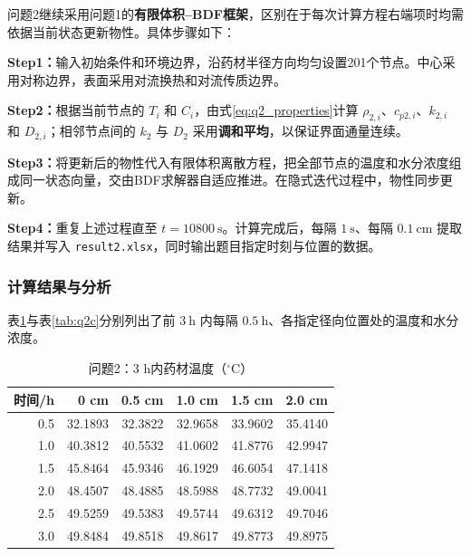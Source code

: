 \documentclass[12pt,a4paper,fontset=none]{ctexart}
\begin{document}
问题2继续采用问题1的\textbf{有限体积--BDF框架}，区别在于每次计算方程右端项时均需依据当前状态更新物性。具体步骤如下：

\noindent\textbf{Step1：}输入初始条件和环境边界，沿药材半径方向均匀设置201个节点。中心采用对称边界，表面采用对流换热和对流传质边界。

\noindent\textbf{Step2：}根据当前节点的 $T_i$ 和 $C_i$，由式\eqref{eq:q2_properties}计算 $\rho_{2,i}$、$c_{p2,i}$、$k_{2,i}$ 和 $D_{2,i}$；相邻节点间的 $k_2$ 与 $D_2$ 采用\textbf{调和平均}，以保证界面通量连续。

\noindent\textbf{Step3：}将更新后的物性代入有限体积离散方程，把全部节点的温度和水分浓度组成同一状态向量，交由BDF求解器自适应推进。在隐式迭代过程中，物性同步更新。

\noindent\textbf{Step4：}重复上述过程直至 $t=10800\ \mathrm s$。计算完成后，每隔 $1\ \mathrm s$、每隔 $0.1\ \mathrm{cm}$ 提取结果并写入 \texttt{result2.xlsx}，同时输出题目指定时刻与位置的数据。

\subsubsection{计算结果与分析}

表\ref{tab:q2t}与表\ref{tab:q2c}分别列出了前 $3\ \mathrm h$ 内每隔 $0.5\ \mathrm h$、各指定径向位置处的温度和水分浓度。

\begin{table}[H]
\centering
\caption{问题2：3 h内药材温度（$^\circ$C）}\label{tab:q2t}
\small
\begin{tabular}{rrrrrr}
\toprule
时间/h & 0 cm & 0.5 cm & 1.0 cm & 1.5 cm & 2.0 cm \\
\midrule
0.5 & 32.1893 & 32.3822 & 32.9658 & 33.9602 & 35.4140 \\
1.0 & 40.3812 & 40.5532 & 41.0602 & 41.8776 & 42.9947 \\
1.5 & 45.8464 & 45.9346 & 46.1929 & 46.6054 & 47.1418 \\
2.0 & 48.4507 & 48.4885 & 48.5988 & 48.7732 & 49.0041 \\
2.5 & 49.5259 & 49.5383 & 49.5744 & 49.6312 & 49.7046 \\
3.0 & 49.8484 & 49.8518 & 49.8617 & 49.8773 & 49.8975 \\
\bottomrule
\end{tabular}
\end{table}
\end{document}
